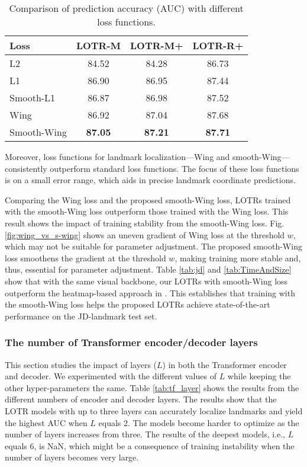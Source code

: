 \documentclass[journal]{IEEEtran}
\begin{document}
\begin{table}
\caption{Comparison of prediction accuracy (AUC) with different loss functions.}
\centering
\begin{tabular}{lccc}
\hline
Loss        & LOTR-M & LOTR-M+ & LOTR-R+\\
\hline
L2           & 84.52  & 84.28   & 86.73\\
L1           & 86.90  & 86.95   & 87.44 \\
Smooth-L1    & 86.87  & 86.98   & 87.52 \\
Wing         & 86.92  & 87.04   & 87.68 \\
Smooth-Wing  & \textbf{87.05}  & \textbf{87.21}   & \textbf{87.71} \\
\hline
\end{tabular}
\par
\label{tab:losses}
\end{table}

Moreover, loss functions for landmark localization---Wing and smooth-Wing---consistently outperform standard loss functions.
The focus of these loss functions is on a small error range, which aids in precise landmark coordinate predictions.

Comparing the Wing loss and the proposed smooth-Wing loss, LOTRs trained with the smooth-Wing loss outperform those trained with the Wing loss. 
This result shows the impact of training stability from the smooth-Wing loss.
Fig. \ref{fig:wing_vs_s-wing} shows an uneven gradient of Wing loss at the threshold $w$, which may not be suitable for parameter adjustment.
The proposed smooth-Wing loss smoothens the gradient at the threshold $w$, making training more stable and, thus, essential for parameter adjustment.
Table \ref{tab:jd} and \ref{tab:TimeAndSize} show that with the same visual backbone, our LOTRs with smooth-Wing loss outperform the heatmap-based approach in \cite{earp2021sub}. 
This establishes that training with the smooth-Wing loss helps the proposed LOTRs achieve state-of-the-art performance on the JD-landmark test set.



\subsubsection{The number of Transformer encoder/decoder layers}\label{subsubsec:ablation_tf_layers}

This section studies the impact of layers ($L$) in both the Transformer encoder and decoder.
We experimented with the different values of $L$ while keeping the other hyper-parameters the same.
Table \ref{tab:tf_layer} shows the results from the different numbers of encoder and decoder layers.
The results show that the LOTR models with up to three layers can accurately localize landmarks and yield the highest AUC when $L$ equals 2.
The models become harder to optimize as the number of layers increases from three.
The results of the deepest models, i.e., $L$ equals 6, is NaN, which might be a consequence of training instability when the number of layers becomes very large.
\end{document}
